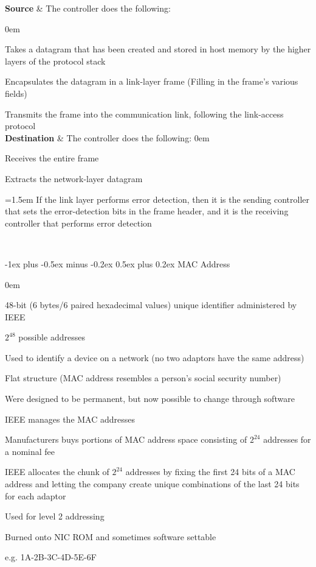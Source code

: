 \documentclass[letterpaper,8pt]{extarticle}
\makeatletter
\renewcommand{\subsection}{\@startsection{subsection}{2}{0mm}%
  {-1ex plus -0.5ex minus -0.2ex}%
  {0.5ex plus 0.2ex}%
{\color{h2}\normalfont\fontsize{6}{6}\selectfont\bfseries}}
\newcommand{\bul}[1]{%
  \par\hangindent=1.5em\hangafter=1
  \noindent\hspace*{0.25em}\scalebox{0.7}{$\bullet$}\hspace{0.5em}%
  \hyphenpenalty=10000\RaggedRight{}#1\par\vspace{0.3ex}%
}
\let\olditemize\itemize \let\endolditemize\enditemize
\renewenvironment{itemize}{\olditemize \itemsep0em}{\endolditemize}
\let\oldenumerate\enumerate \let\endoldenumerate\endenumerate
\renewenvironment{enumerate}{\oldenumerate \itemsep0em}{\endoldenumerate}
\let\oldtabular\tabular \let\oldendtabular\endtabular
\renewenvironment{tabular}[1]{%
  \hyphenpenalty=10000\RaggedRight{}
  \hbadness=10000\relax
  \oldtabular{#1}%
}{%
  \oldendtabular
}
\makeatother
\begin{document}
\begin{multicols*}{5}
  \begin{center}
    \begin{tabular}{| m{1cm} | m{3.8cm} |}
      \hline
      \textbf{Source}      &
      The controller does the following: \par
      \begin{enumerate}
        \item Takes a datagram that has been created and stored in host memory by the higher layers of the protocol stack
        \item Encapsulates the datagram in a link-layer frame (Filling in the frame's various fields)
        \item Transmits the frame into the communication link, following the
          link-access protocol
      \end{enumerate}
      \\
      \hline
      \textbf{Destination} &
      The controller does the following:
      \begin{enumerate}
        \item Receives the entire frame
        \item Extracts the network-layer datagram
      \end{enumerate}
      \bul{If the link layer performs error detection, then it is the sending controller that sets the error-detection bits in the frame header, and it is the receiving controller that performs error detection}
      \\
      \hline
    \end{tabular}
  \end{center}

  \subsection{MAC Address}

  \begin{itemize}
    \item 48-bit (6 bytes/6 paired hexadecimal values) unique identifier administered by IEEE
    \item $2^{48}$ possible addresses
    \item Used to identify a device on a network (no two adaptors have the same address)
    \item Flat structure (MAC address resembles a person's social security number)
    \item Were designed to be permanent, but now possible to change through software
    \item IEEE manages the MAC addresses
    \item Manufacturers buys portions of MAC address space consisting of $2^{24}$ addresses for a nominal fee
    \item IEEE allocates the chunk of $2^{24}$ addresses by fixing the first 24 bits of a MAC address and letting the company create unique combinations of the last 24 bits for each adaptor
    \item Used for level 2 addressing
    \item Burned onto NIC ROM and sometimes software settable
    \item e.g. 1A-2B-3C-4D-5E-6F


\end{itemize}
\end{multicols*}
\end{document}
